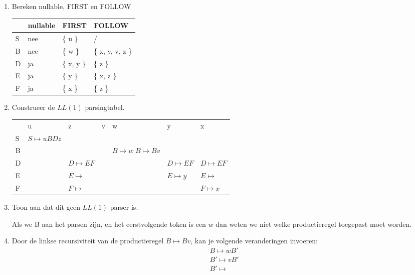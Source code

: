 \begin{enumerate}
	\item Bereken nullable, FIRST en FOLLOW
	\begin{table}[h]
		\centering
		\begin{tabular}{| l | l | l | l |}
			& nullable & FIRST & FOLLOW \\
			\hline
			S & nee & \{ u \}    & /	 			\\
			B & nee & \{ w \}    & \{ x, y, v, z \}	\\
			D & ja  & \{ x, y \} & \{ z \}			\\
			E & ja  & \{ y \}    & \{ x, z \}		\\
			F & ja  & \{ x \}    & \{ z \}			\\
			\hline
		\end{tabular}
	\end{table}

	\item Construeer de $LL(1)$ parsingtabel.
	\begin{table}[h]
		\centering
		\begin{tabular}{| l | l | l | l | l | l | l |}
			\hline
			   & u 					& z & v & w & y & x \\
			 S & $S \mapsto uBDz$  	&   &   &   &   &   \\
			 B &   					&   &   & $B \mapsto w \; B \mapsto Bv$  &   &   \\
			 D &  					& $D \mapsto EF$  &   &   & $D \mapsto EF$  & $D \mapsto EF$   \\
			 E &   					& $E \mapsto $  &   &   & $E \mapsto y$  &  $E \mapsto $ \\
			 F &   					& $F \mapsto $  &   &   &   &  $F \mapsto x$ \\
			\hline
		\end{tabular}
	\end{table}

	\item Toon aan dat dit geen $LL(1)$ parser is.
	
	Als we B aan het parsen zijn, en het eerstvolgende token is een $w$ dan weten we niet welke productieregel toegepast moet worden.
	
	\item Door de linkse recursiviteit van de productieregel $B \mapsto Bv$, kan je volgende veranderingen invoeren:
	\begin{equation*}
		\begin{split}
		& B \mapsto wB' \\
		& B' \mapsto vB' \\
		& B' \mapsto 
		\end{split}
	\end{equation*}
\end{enumerate}

